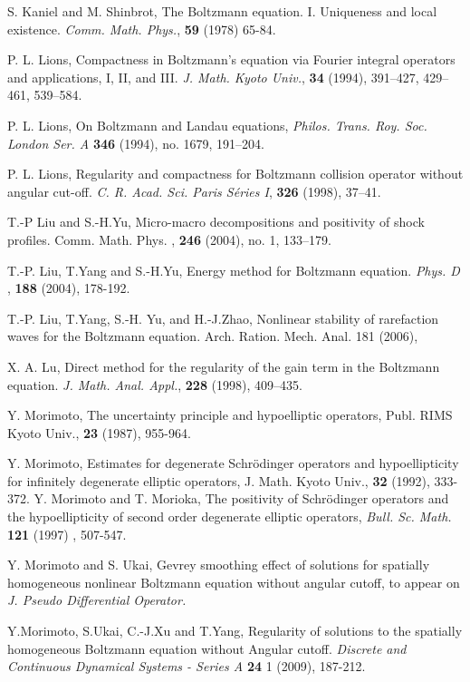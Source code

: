 \documentclass{amsart}[12pt, article]
\begin{document}
\begin{thebibliography}{99}
 S. Kaniel and M. Shinbrot, The Boltzmann equation.
I. Uniqueness and local existence. {\it Comm. Math. Phys.}, {\bf 59}
(1978) 65-84.

 P. L. Lions, Compactness in Boltzmann's equation via Fourier
integral operators and applications, I, II, and III.
{\it J. Math. Kyoto Univ.}, {\bf 34} (1994), 391--427, 429--461, 539--584.

 P. L. Lions, On Boltzmann and Landau equations, {\it Philos. Trans. Roy. Soc. London Ser. A}
    {\bf 346} (1994), no. 1679, 191--204.

 P. L. Lions, Regularity and compactness for Boltzmann collision operator
without angular cut-off. {\it C. R. Acad. Sci. Paris S\'eries I}, {\bf 326} (1998), 37--41.

 T.-P Liu and S.-H.Yu, Micro-macro decompositions and positivity of shock profiles.  Comm. Math. Phys. , {\bf 246}  (2004),  no. 1, 133--179.

T.-P. Liu, T.Yang and S.-H.Yu,
Energy method for Boltzmann equation.
{\it Phys. D }, {\bf 188}  (2004), 178-192.

T.-P. Liu, T.Yang, S.-H. Yu, and H.-J.Zhao, Nonlinear stability of rarefaction waves for the Boltzmann equation.  Arch. Ration. Mech. Anal.  181  (2006),

 X. A. Lu,
Direct method for the regularity of the gain term in  the Boltzmann
equation. {\it J. Math. Anal. Appl.}, {\bf 228} (1998), 409--435.

Y. Morimoto,
The uncertainty principle and hypoelliptic
operators,
Publ. RIMS Kyoto Univ., {\bf 23} (1987), 955-964.

Y. Morimoto,
Estimates for degenerate Schr\"odinger operators
and hypoellipticity for infinitely degenerate elliptic operators,
J. Math. Kyoto Univ., {\bf 32} (1992), 333-372.
Y. Morimoto and T. Morioka,
The positivity of Schr\"odinger operators and the hypoellipticity of second order
degenerate elliptic operators, {\it Bull. Sc. Math.}  {\bf121} (1997) , 507-547.

 Y. Morimoto and S. Ukai,
Gevrey smoothing effect of solutions for  spatially
homogeneous nonlinear Boltzmann  equation without angular cutoff,
to appear on {\it J. Pseudo Differential Operator.}

Y.Morimoto, S.Ukai, C.-J.Xu and T.Yang, Regularity of solutions to
the spatially homogeneous Boltzmann equation without Angular cutoff.
{\it Discrete and Continuous Dynamical Systems -
Series A} {\bf 24} 1 (2009), 187-212.


\end{thebibliography}
\end{document}

